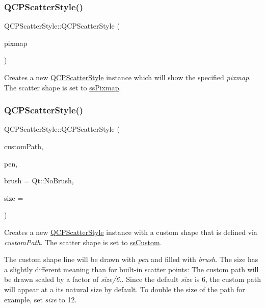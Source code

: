 \subsubsection{\texorpdfstring{Q\+C\+P\+Scatter\+Style()}{QCPScatterStyle()}\hspace{0.1cm}{\footnotesize\ttfamily [6/7]}}
{\footnotesize\ttfamily Q\+C\+P\+Scatter\+Style\+::\+Q\+C\+P\+Scatter\+Style (\begin{DoxyParamCaption}\item[{const Q\+Pixmap \&}]{pixmap }\end{DoxyParamCaption})}

Creates a new \hyperlink{class_q_c_p_scatter_style}{Q\+C\+P\+Scatter\+Style} instance which will show the specified {\itshape pixmap}. The scatter shape is set to \hyperlink{class_q_c_p_scatter_style_adb31525af6b680e6f1b7472e43859349a8718b849ca7c307b07b8e091efb0c31e}{ss\+Pixmap}. \mbox{\label{class_q_c_p_scatter_style_a879c30647683b3cfbde2afecea815e6f}} 
\subsubsection{\texorpdfstring{Q\+C\+P\+Scatter\+Style()}{QCPScatterStyle()}\hspace{0.1cm}{\footnotesize\ttfamily [7/7]}}
{\footnotesize\ttfamily Q\+C\+P\+Scatter\+Style\+::\+Q\+C\+P\+Scatter\+Style (\begin{DoxyParamCaption}\item[{const Q\+Painter\+Path \&}]{custom\+Path,  }\item[{const Q\+Pen \&}]{pen,  }\item[{const Q\+Brush \&}]{brush = {\ttfamily Qt\+:\+:NoBrush},  }\item[{double}]{size = {} }\end{DoxyParamCaption})}

Creates a new \hyperlink{class_q_c_p_scatter_style}{Q\+C\+P\+Scatter\+Style} instance with a custom shape that is defined via {\itshape custom\+Path}. The scatter shape is set to \hyperlink{class_q_c_p_scatter_style_adb31525af6b680e6f1b7472e43859349a15d9bcfd9de94edda949006529f9219d}{ss\+Custom}.

The custom shape line will be drawn with {\itshape pen} and filled with {\itshape brush}. The size has a slightly different meaning than for built-\/in scatter points\+: The custom path will be drawn scaled by a factor of {\itshape size/6.}. Since the default {\itshape size} is 6, the custom path will appear at a its natural size by default. To double the size of the path for example, set {\itshape size} to 12. 

